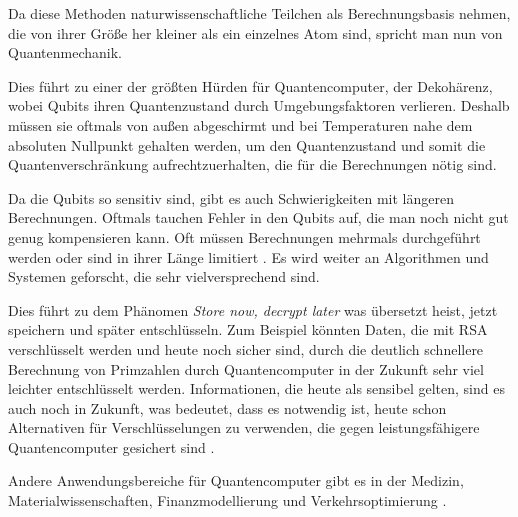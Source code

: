 Da diese Methoden naturwissenschaftliche Teilchen als Berechnungsbasis nehmen, die von ihrer Größe her kleiner als ein einzelnes Atom sind, spricht man nun von Quantenmechanik. 

Dies führt zu einer der größten Hürden für Quantencomputer, der Dekohärenz, wobei Qubits ihren Quantenzustand durch Umgebungsfaktoren verlieren. Deshalb müssen sie oftmals von außen abgeschirmt und bei Temperaturen nahe dem absoluten Nullpunkt gehalten werden, um den Quantenzustand und somit die Quantenverschränkung aufrechtzuerhalten, die für die Berechnungen nötig sind.

Da die Qubits so sensitiv sind, gibt es auch Schwierigkeiten mit längeren Berechnungen. Oftmals tauchen Fehler in den Qubits auf, die man noch nicht gut genug kompensieren kann. Oft müssen Berechnungen mehrmals durchgeführt werden oder sind in ihrer Länge limitiert \cite{brubaker_quantum_2024}. Es wird weiter an Algorithmen und Systemen geforscht, die sehr vielversprechend sind.

Dies führt zu dem Phänomen  \textit{Store now, decrypt later} was übersetzt heist, jetzt speichern und später entschlüsseln. Zum Beispiel könnten Daten, die mit RSA verschlüsselt werden und heute noch sicher sind, durch die deutlich schnellere Berechnung von Primzahlen durch Quantencomputer in der Zukunft sehr viel leichter entschlüsselt werden. 
Informationen, die heute als sensibel gelten, sind es auch noch in Zukunft, was bedeutet, dass es notwendig ist, heute schon Alternativen für Verschlüsselungen zu verwenden, die gegen leistungsfähigere Quantencomputer gesichert sind \cite{veritasium_how_2023}.

Andere Anwendungsbereiche für Quantencomputer gibt es in der Medizin, 
Materialwissenschaften, Finanzmodellierung 
und Verkehrsoptimierung \cite{Applications_10_nodate}.